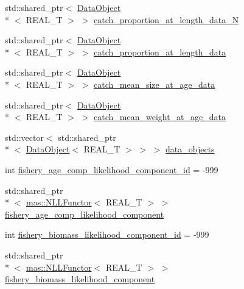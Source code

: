 \begin{DoxyCompactItemize}
std\-::shared\-\_\-ptr$<$ \hyperlink{structmas_1_1_data_object}{Data\-Object}\\*
$<$ R\-E\-A\-L\-\_\-\-T $>$ $>$ \hyperlink{structmas_1_1_fleet_a5bacb0578a3e651fc28a8ba2d233a14b}{catch\-\_\-proportion\-\_\-at\-\_\-length\-\_\-data\-\_\-\-N}
\item 
std\-::shared\-\_\-ptr$<$ \hyperlink{structmas_1_1_data_object}{Data\-Object}\\*
$<$ R\-E\-A\-L\-\_\-\-T $>$ $>$ \hyperlink{structmas_1_1_fleet_ae18e627f80c8ca519535bfc90d9634b5}{catch\-\_\-proportion\-\_\-at\-\_\-length\-\_\-data}
\item 
std\-::shared\-\_\-ptr$<$ \hyperlink{structmas_1_1_data_object}{Data\-Object}\\*
$<$ R\-E\-A\-L\-\_\-\-T $>$ $>$ \hyperlink{structmas_1_1_fleet_a46862ac16c8d360c9290dad74aee9a17}{catch\-\_\-mean\-\_\-size\-\_\-at\-\_\-age\-\_\-data}
\item 
std\-::shared\-\_\-ptr$<$ \hyperlink{structmas_1_1_data_object}{Data\-Object}\\*
$<$ R\-E\-A\-L\-\_\-\-T $>$ $>$ \hyperlink{structmas_1_1_fleet_acc8b3609ca90f6efd5801fb8820777f8}{catch\-\_\-mean\-\_\-weight\-\_\-at\-\_\-age\-\_\-data}
\item 
std\-::vector$<$ std\-::shared\-\_\-ptr\\*
$<$ \hyperlink{structmas_1_1_data_object}{Data\-Object}$<$ R\-E\-A\-L\-\_\-\-T $>$ $>$ $>$ \hyperlink{structmas_1_1_fleet_a9b5dca826b2d1b7b05a705b903a27fad}{data\-\_\-objects}
\item 
int \hyperlink{structmas_1_1_fleet_aa87c827150245f5859ca47fc303eceb8}{fishery\-\_\-age\-\_\-comp\-\_\-likelihood\-\_\-component\-\_\-id} = -\/999
\item 
std\-::shared\-\_\-ptr\\*
$<$ \hyperlink{structmas_1_1_n_l_l_functor}{mas\-::\-N\-L\-L\-Functor}$<$ R\-E\-A\-L\-\_\-\-T $>$ $>$ \hyperlink{structmas_1_1_fleet_ae0e54dbe1514b3d5a33293b4250e0be4}{fishery\-\_\-age\-\_\-comp\-\_\-likelihood\-\_\-component}
\item 
int \hyperlink{structmas_1_1_fleet_a2f3667e571a5c22538606e4c3156f7b5}{fishery\-\_\-biomass\-\_\-likelihood\-\_\-component\-\_\-id} = -\/999
\item 
std\-::shared\-\_\-ptr\\*
$<$ \hyperlink{structmas_1_1_n_l_l_functor}{mas\-::\-N\-L\-L\-Functor}$<$ R\-E\-A\-L\-\_\-\-T $>$ $>$ \hyperlink{structmas_1_1_fleet_abd3235a7cfd42c0106c59e8b51f4671d}{fishery\-\_\-biomass\-\_\-likelihood\-\_\-component}

\end{DoxyCompactItemize}
